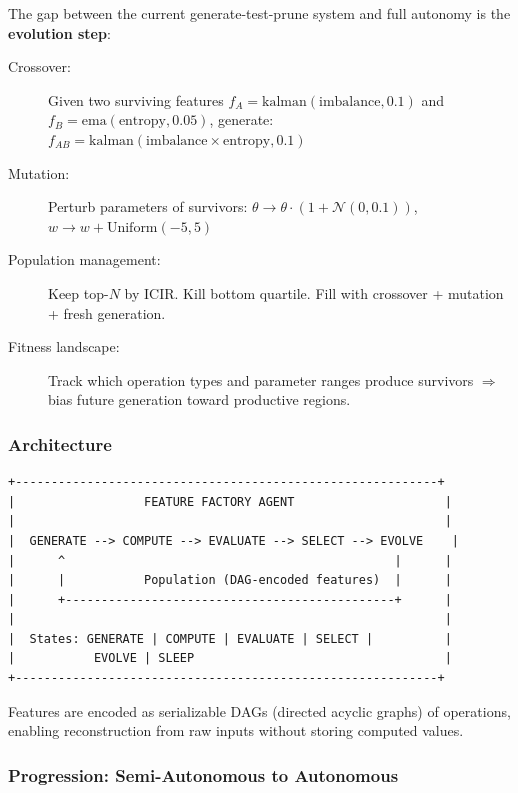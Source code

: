 \documentclass[11pt,a4paper]{article}
\begin{document}
The gap between the current generate-test-prune system and full autonomy is the \textbf{evolution step}:

\begin{description}
    \item[Crossover:] Given two surviving features $f_A = \text{kalman}(\text{imbalance}, 0.1)$ and $f_B = \text{ema}(\text{entropy}, 0.05)$, generate: $f_{AB} = \text{kalman}(\text{imbalance} \times \text{entropy}, 0.1)$
    \item[Mutation:] Perturb parameters of survivors: $\theta \to \theta \cdot (1 + \mathcal{N}(0, 0.1))$, $w \to w + \text{Uniform}(-5, 5)$
    \item[Population management:] Keep top-$N$ by ICIR. Kill bottom quartile. Fill with crossover + mutation + fresh generation.
    \item[Fitness landscape:] Track which operation types and parameter ranges produce survivors $\Rightarrow$ bias future generation toward productive regions.
\end{description}

\subsubsection{Architecture}

\begin{verbatim}
+-----------------------------------------------------------+
|                  FEATURE FACTORY AGENT                     |
|                                                            |
|  GENERATE --> COMPUTE --> EVALUATE --> SELECT --> EVOLVE    |
|      ^                                              |      |
|      |           Population (DAG-encoded features)  |      |
|      +----------------------------------------------+      |
|                                                            |
|  States: GENERATE | COMPUTE | EVALUATE | SELECT |          |
|           EVOLVE | SLEEP                                   |
+-----------------------------------------------------------+
\end{verbatim}

Features are encoded as serializable DAGs (directed acyclic graphs) of operations, enabling reconstruction from raw inputs without storing computed values.

\subsubsection{Progression: Semi-Autonomous to Autonomous}
\end{document}
